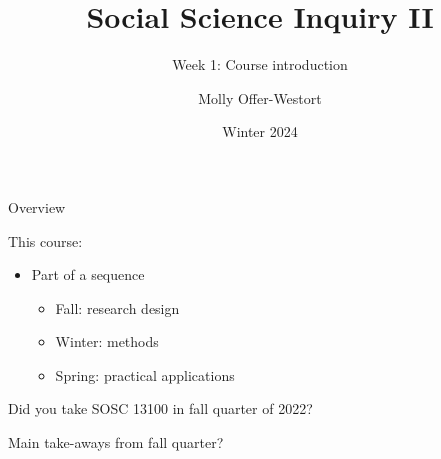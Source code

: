\documentclass[xcolor={dvipsnames}]{beamer}
\title{Social Science Inquiry II}
\subtitle{Week 1: Course introduction}
\date{Winter 2024}
\author{Molly Offer-Westort}
\institute{Department of Political Science, \\University of Chicago}
\begin{document}


\frame{\titlepage
\thispagestyle{empty}
}
\begin{frame}{Overview}

This course:\pause
\begin{itemize}
\item Part of a sequence \pause
\begin{itemize}
\item Fall: research design \pause
\item Winter: methods \pause
\item Spring: practical applications
\end{itemize}
\end{itemize}

\pause

Did you take SOSC 13100 in fall quarter of 2022?

\end{frame}



\begin{frame}

\begin{center}
Main take-aways from fall quarter?
\end{center}

\end{frame}



\end{document}
